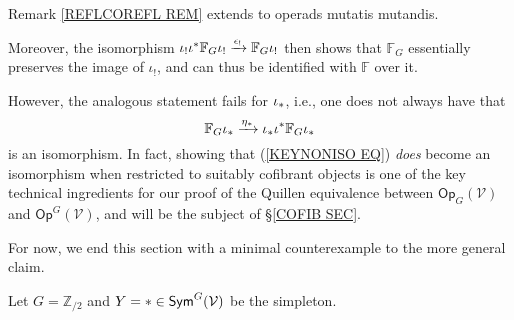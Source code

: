 \documentclass[a4paper,10pt]{article}%
\begin{document}
\begin{remark}
  Remark \ref{REFLCOREFL REM} extends to operads mutatis mutandis.
  
  Moreover, the isomorphism
  $\iota_{!}\iota^{\**} \mathbb{F}_G \iota_{!}
  \xrightarrow{\epsilon_!}
  \mathbb{F}_G \iota_{!}$
  then shows that $\mathbb{F}_G$ essentially preserves the image of $\iota_!$, and can thus be identified with $\mathbb{F}$ over it.

  However, the analogous statement fails for $\iota_{\**}$, i.e., one does not always have that
  \begin{equation}\label{KEYNONISO EQ}
    \mathbb{F}_G \iota_{\**}
    \xrightarrow{\eta_{\**}}
    \iota_{\**}\iota^{\**} \mathbb{F}_G \iota_{\**}
  \end{equation}
  is an isomorphism. 
  In fact, showing that (\ref{KEYNONISO EQ})
  \textit{does} become an isomorphism when restricted to suitably cofibrant objects is one of the key technical ingredients for our proof of the Quillen equivalence between 
  $\mathsf{Op}_G(\mathcal{V})$ and
  $\mathsf{Op}^G(\mathcal{V})$, 
  and will be the subject of \S \ref{COFIB SEC}.

  For now, we end this section with a minimal counterexample to  the more general claim.

  Let $G=\mathbb{Z}_{/2}$ and 
  $Y=\** \in \mathsf{Sym}^G(\mathcal{V})$ be the simpleton.


\end{remark}
\end{document}
